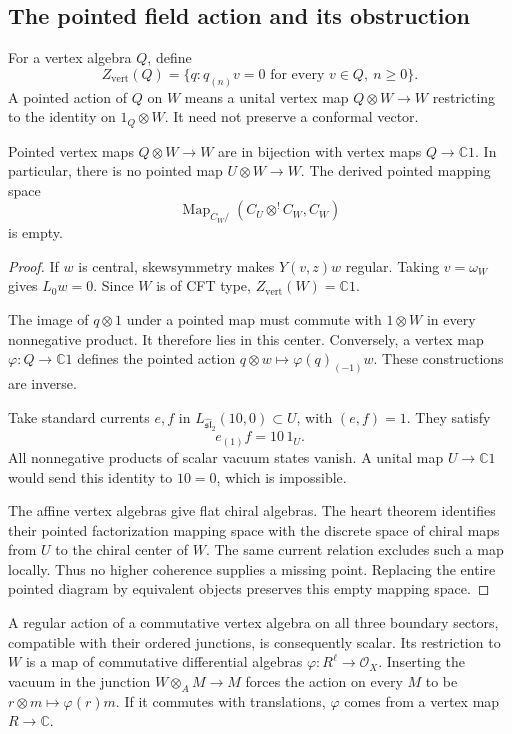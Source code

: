 \subsection{The pointed field action and its obstruction}

For a vertex algebra $Q$, define
\[
 Z_{\mathrm{vert}}(Q)=
 \{q:q_{(n)}v=0\text{ for every }v\in Q,\ n\geq0\}.
\]
A pointed action of $Q$ on $W$ means a unital vertex map
$Q\otimes W\to W$ restricting to the identity on
$1_Q\otimes W$. It need not preserve a conformal vector.

\begin{proposition}
\label{v4-arith:centers:prop:e6-pointed}
Pointed vertex maps $Q\otimes W\to W$ are in bijection
with vertex maps $Q\to\mathbb C1$.
In particular, there is no pointed map $U\otimes W\to W$.
The derived pointed mapping space
\[
 \operatorname{Map}_{C_W/}(C_U\otimes^!C_W,C_W)
\]
is empty.
\end{proposition}

\begin{proof}
If $w$ is central, skewsymmetry makes $Y(v,z)w$ regular.
Taking $v=\omega_W$ gives $L_0w=0$.
Since $W$ is of CFT type, $Z_{\mathrm{vert}}(W)=\mathbb C1$.

The image of $q\otimes1$ under a pointed map must commute
with $1\otimes W$ in every nonnegative product.
It therefore lies in this center.
Conversely, a vertex map $\varphi:Q\to\mathbb C1$ defines
the pointed action $q\otimes w\mapsto\varphi(q)_{(-1)}w$.
These constructions are inverse.

Take standard currents $e,f$ in
$L_{\widehat{\mathfrak{sl}}_2}(10,0)\subset U$, with
$(e,f)=1$. They satisfy
\[
 e_{(1)}f=10\,1_U.
\]
All nonnegative products of scalar vacuum states vanish.
A unital map $U\to\mathbb C1$ would send this identity
to $10=0$, which is impossible.

The affine vertex algebras give flat chiral algebras.
The heart theorem identifies their pointed factorization
mapping space with the discrete space of chiral maps
from $U$ to the chiral center of $W$.
The same current relation excludes such a map locally.
Thus no higher coherence supplies a missing point.
Replacing the entire pointed diagram by equivalent
objects preserves this empty mapping space.
\end{proof}

A regular action of a commutative vertex algebra on all
three boundary sectors, compatible with their ordered
junctions, is consequently scalar.
Its restriction to $W$ is a map of commutative differential
algebras $\varphi:R^\ell\to\mathcal O_X$.
Inserting the vacuum in the junction $W\otimes_A M\to M$
forces the action on every $M$ to be
$r\otimes m\mapsto\varphi(r)m$.
If it commutes with translations, $\varphi$ comes from
a vertex map $R\to\mathbb C$.

